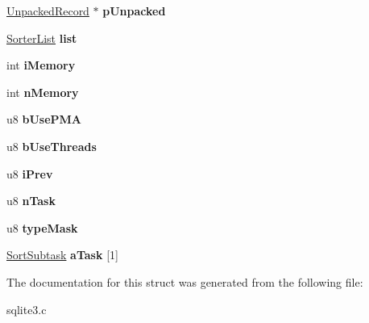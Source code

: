 \begin{DoxyCompactItemize}
\item 
\hyperlink{structUnpackedRecord}{Unpacked\+Record} $\ast$ {\bfseries p\+Unpacked}\hypertarget{structVdbeSorter_a0d85cdf1cf25c75cf90394d1bcfd27b9}{}\label{structVdbeSorter_a0d85cdf1cf25c75cf90394d1bcfd27b9}

\item 
\hyperlink{structSorterList}{Sorter\+List} {\bfseries list}\hypertarget{structVdbeSorter_a5e4a486d8aba4b45e3b7000d0a3b2b5b}{}\label{structVdbeSorter_a5e4a486d8aba4b45e3b7000d0a3b2b5b}

\item 
int {\bfseries i\+Memory}\hypertarget{structVdbeSorter_a32ec545e32e7b79fe8f72e15f4656786}{}\label{structVdbeSorter_a32ec545e32e7b79fe8f72e15f4656786}

\item 
int {\bfseries n\+Memory}\hypertarget{structVdbeSorter_a53740d50989018beadaff7fe814407f5}{}\label{structVdbeSorter_a53740d50989018beadaff7fe814407f5}

\item 
u8 {\bfseries b\+Use\+P\+MA}\hypertarget{structVdbeSorter_ae373cf1d1f102b34e005f0326f690bd7}{}\label{structVdbeSorter_ae373cf1d1f102b34e005f0326f690bd7}

\item 
u8 {\bfseries b\+Use\+Threads}\hypertarget{structVdbeSorter_aaf62cb4ac61aa2bcbf4ee00a2e12fe90}{}\label{structVdbeSorter_aaf62cb4ac61aa2bcbf4ee00a2e12fe90}

\item 
u8 {\bfseries i\+Prev}\hypertarget{structVdbeSorter_aa7cc8519f1b6d621de13fc383fb5478a}{}\label{structVdbeSorter_aa7cc8519f1b6d621de13fc383fb5478a}

\item 
u8 {\bfseries n\+Task}\hypertarget{structVdbeSorter_a5a6475ca0a9de4321653a4afb4fcbef0}{}\label{structVdbeSorter_a5a6475ca0a9de4321653a4afb4fcbef0}

\item 
u8 {\bfseries type\+Mask}\hypertarget{structVdbeSorter_a75a7b43b4fe86ee6348dd576b4fb1c1f}{}\label{structVdbeSorter_a75a7b43b4fe86ee6348dd576b4fb1c1f}

\item 
\hyperlink{structSortSubtask}{Sort\+Subtask} {\bfseries a\+Task} \mbox{[}1\mbox{]}\hypertarget{structVdbeSorter_abf5c3d717a20bf0ce713862f0c7b2653}{}\label{structVdbeSorter_abf5c3d717a20bf0ce713862f0c7b2653}

\end{DoxyCompactItemize}


The documentation for this struct was generated from the following file\+:\begin{DoxyCompactItemize}
\item 
sqlite3.\+c\end{DoxyCompactItemize}
